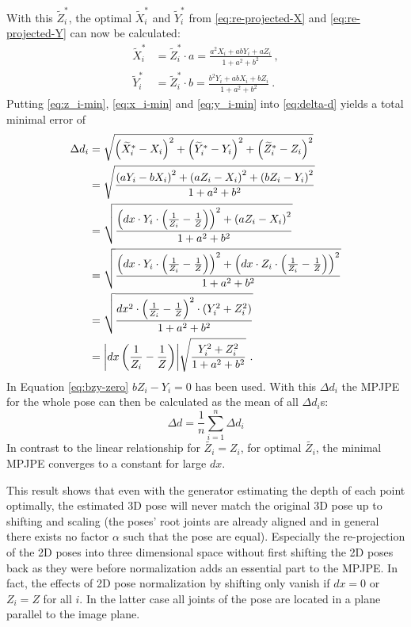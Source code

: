 With this $\widetilde{Z}_i^\ast$, the optimal $\widetilde{X}_i^\ast$ and $\widetilde{Y}_i^\ast$ from \autoref{eq:re-projected-X} and \autoref{eq:re-projected-Y} can now be calculated:
\begin{align}
	\label{eq:x_i-min}
	\widetilde{X}_i^\ast &= \widetilde{Z}_i^\ast \cdot a
	= \frac{a^2 X_i + a b Y_i +  a Z_i}{1 + a^2 + b^2} \ ,\\
	\label{eq:y_i-min}
	\widetilde{Y}_i^\ast &= \widetilde{Z}_i^\ast \cdot b
	= \frac{b^2 Y_i + a b X_i + b Z_i}{1 + a^2 + b^2} \ . 
\end{align}
Putting \eqref{eq:z_i-min}, \eqref{eq:x_i-min} and \eqref{eq:y_i-min} into \autoref{eq:delta-d} yields a total minimal error of 
\begin{align}
	\Delta d_i &= 
	\sqrt{\left (\widetilde{X}_i^\ast - X_i \right )^2 + \left (\widetilde{Y}_i^\ast - Y_i \right )^2 + \left (\widetilde{Z}_i^\ast - Z_i \right )^2}\\
	& = \sqrt{\frac{\left (a Y_i - b X_i \right )^2 + \left (a Z_i - X_i \right )^2 + \left (b Z_i - Y_i \right )^2}{1 + a^2 + b^2}} \\
	\label{eq:bzy-zero}
	&= \sqrt{\frac{\left (dx \cdot Y_i \cdot \left (\frac{1}{Z_i} - \frac{1}{Z} \right) \right)^2 + \left (a Z_i - X_i \right )^2}{1 + a^2 + b^2}}\\
	& = \sqrt{\frac{\left (dx \cdot Y_i \cdot \left (\frac{1}{Z_i} - \frac{1}{Z} \right ) \right)^2 + \left (dx \cdot Z_i \cdot \left (\frac{1}{Z_i} - \frac{1}{Z} \right ) \right)^2}{1 + a^2 + b^2}} \\
	& = \sqrt{\frac{dx^2 \cdot \left (\frac{1}{Z_i} - \frac{1}{Z} \right )^2 \cdot \left (Y_i^2 + Z_i^2 \right ) }{1 + a^2 + b^2}}\\
	\label{eq:minimum-delta-d}
	& = \abs{dx \left (\frac{1}{Z_i} - \frac{1}{Z} \right )} \sqrt{\frac{Y_i^2 + Z_i^2}{1 + a^2 + b^2}} \ .
\end{align}
In Equation \eqref{eq:bzy-zero} $b Z_i - Y_i = 0$ has been used.
With this $\Delta d_i$ the MPJPE for the whole pose can then be calculated as the mean of all $\Delta d_i$s:
\begin{equation}
	\label{eq:minimum-mpjpe-on-shift}
	\Delta d = \frac{1}{n} \sum_{i = 1}^{n} \Delta d_i 
\end{equation}
In contrast to the linear relationship for $\widetilde{Z_i} = Z_i$, for optimal $\widetilde{Z_i}$, the minimal MPJPE converges to a constant for large $dx$.

This result shows that even with the generator estimating the depth of each point optimally, the estimated 3D pose will never match the original 3D pose up to shifting and scaling (the poses' root joints are already aligned and in general there exists no factor $\alpha$ such that the pose are equal).
Especially the re-projection of the 2D poses into three dimensional space without first shifting the 2D poses back as they were before normalization adds an essential part to the MPJPE.
In fact, the effects of 2D pose normalization by shifting only vanish if $dx = 0$ or $Z_i = Z$ for all $i$. 
In the latter case all joints of the pose are located in a plane parallel to the image plane.

